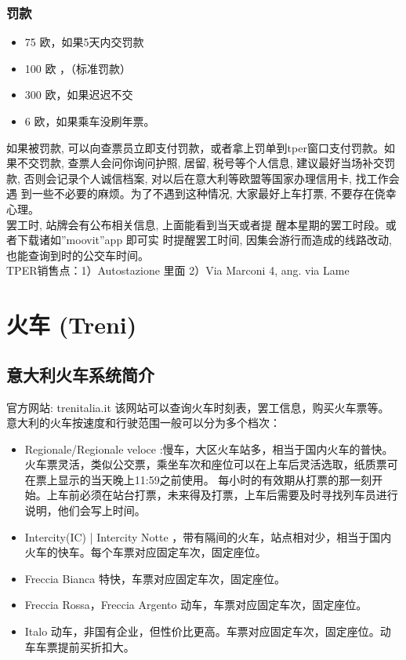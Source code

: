 \subsubsection{罚款}
\begin{itemize}
\item  75 欧，如果5天内交罚款
\item  100 欧 ，（标准罚款）
\item  300 欧，如果迟迟不交
\item  6 欧，如果乘车没刷年票。
\end{itemize}
如果被罚款, 可以向查票员立即支付罚款，或者拿上罚单到tper窗口支付罚款。如果不交罚款, 查票人会问你询问护照, 居留, 税号等个人信息, 建议最好当场补交罚款, 否则会记录个人诚信档案, 对以后在意大利等欧盟等国家办理信用卡, 找工作会遇 到一些不必要的麻烦。为了不遇到这种情况, 大家最好上车打票, 不要存在侥幸心理。 \\
罢工时, 站牌会有公布相关信息, 上面能看到当天或者提 醒本星期的罢工时段。或者下载诸如”moovit”app 即可实 时提醒罢工时间, 因集会游行而造成的线路改动, 也能查询到时的公交车时间。 \\
TPER销售点：1）Autostazione 里面 2）Via Marconi 4, ang. via Lame



\section{火车 (Treni)}

\subsection{意大利火车系统简介}

官方网站: trenitalia.it 该网站可以查询火车时刻表，罢工信息，购买火车票等。
意大利的火车按速度和行驶范围一般可以分为多个档次：
\begin{itemize}
\item  Regionale/Regionale veloce :慢车，大区火车站多，相当于国内火车的普快。 火车票灵活，类似公交票，乘坐车次和座位可以在上车后灵活选取，纸质票可在票上显示的当天晚上11:59之前使用。 每小时的有效期从打票的那一刻开始。上车前必须在站台打票，未来得及打票，上车后需要及时寻找列车员进行说明，他们会写上时间。
\item  Intercity(IC) | Intercity Notte ，带有隔间的火车，站点相对少，相当于国内火车的快车。每个车票对应固定车次，固定座位。
\item  Freccia Bianca 特快，车票对应固定车次，固定座位。
\item  Freccia Rossa，Freccia Argento 动车，车票对应固定车次，固定座位。
\item  Italo 动车，非国有企业，但性价比更高。车票对应固定车次，固定座位。动车车票提前买折扣大。
\end{itemize}
